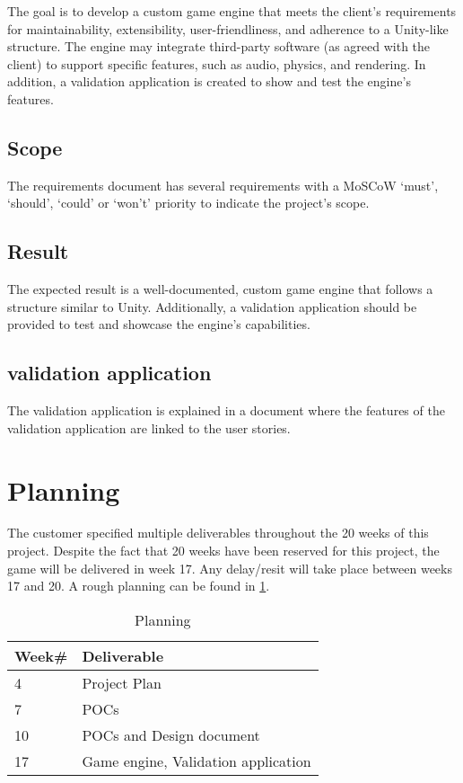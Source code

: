 \documentclass{projdoc}
\begin{document}
The goal is to develop a custom game engine that meets the client's requirements for maintainability, extensibility, user-friendliness, and adherence to a Unity-like structure. The engine may integrate third-party software (as agreed with the client) to support specific features, such as audio, physics, and rendering. In addition, a validation application is created to show and test the engine's features.

\subsection{Scope}
The requirements document \autocite{crepe:requirements} has several requirements with a MoSCoW `must', `should', `could' or `won't' priority to indicate the project's scope.

\subsection{Result}

The expected result is a well-documented, custom game engine that follows a structure similar to Unity. Additionally, a validation application should be provided to test and showcase the engine's capabilities.

\subsection{validation application}

The validation application \autocite{crepe:validation-application} is explained in a document where the features of the validation application are linked to the user stories.

\section{Planning}

The customer specified multiple deliverables throughout the 20 weeks of this project. Despite the fact that 20 weeks have been reserved for this project, the game will be delivered in week 17. Any delay/resit will take place between weeks 17 and 20. A rough planning can be found in \cref{tab:planning}.

\begin{table}
	\begin{tabularx}{\linewidth}{lX}
		\toprule
		\textbf{Week\#} & \textbf{Deliverable}\\
		\midrule
		4 & Project Plan\\
		7 & POCs\\
		10 & POCs and Design document\\
		17 & Game engine, Validation application\\
		\bottomrule
	\end{tabularx}
	\caption{Planning}
	\label{tab:planning}
\end{table}
\end{document}
